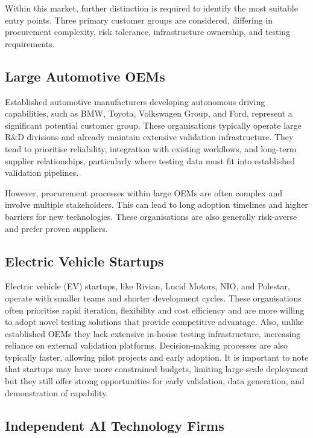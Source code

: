 Within this market, further distinction is required to identify the most suitable entry points. Three primary customer groups are considered, differing in procurement complexity, risk tolerance, infrastructure ownership, and testing requirements.

\subsection{Large Automotive OEMs}

Established automotive manufacturers developing autonomous driving capabilities, such as BMW, Toyota, Volkswagen Group, and Ford, represent a significant potential customer group. These organisations typically operate large R\&D divisions and already maintain extensive validation infrastructure. They tend to prioritise reliability, integration with existing workflows, and long-term supplier relationships, particularly where testing data must fit into established validation pipelines.

However, procurement processes within large OEMs are often complex and involve multiple stakeholders. This can lead to long adoption timelines and higher barriers for new technologies. These organisations are also generally risk-averse and prefer proven suppliers.

\subsection{Electric Vehicle Startups}

Electric vehicle (EV) startups, like Rivian, Lucid Motors, NIO, and Polestar, operate with smaller teams and shorter development cycles. These organisations often prioritise rapid iteration, flexibility and cost efficiency and are more willing to adopt novel testing solutions that provide competitive advantage. 
Also, unlike established OEMs they lack extensive in-house testing infrastructure, increasing reliance on external validation platforms. Decision-making processes are also typically faster, allowing pilot projects and early adoption.
It is important to note that startups may have more constrained budgets, limiting large-scale deployment but they still offer strong opportunities for early validation, data generation, and demonstration of capability.

\subsection{Independent AI Technology Firms}

